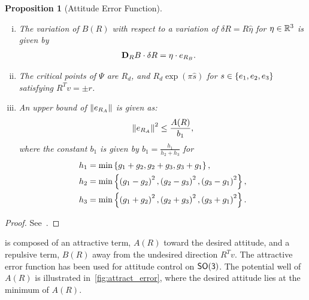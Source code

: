 \documentclass[letterpaper, 10 pt, conference]{ieeeconf}  %
\newtheorem{prop}{Proposition}
\begin{document}
\begin{prop}[Attitude Error Function]
\begin{enumerate}[(i)]
	\begin{align}
		\dirDiff{A}{R} &= \eta \cdot e_{R_A} .
	\end{align}
	\item \label{item:prop_erb} The variation of \( B(R) \) with respect to a variation of \( \delta R = R \hat{\eta} \) for \( \eta \in \mathbb{R}^3 \) is given by
	\begin{align}
		\mathbf{D}_{R} B \cdot \delta R &= \eta \cdot e_{R_{B}} .
	\end{align}
	\item \label{item:prop_crit}The critical points of \( \Psi \) are $R_d$, and $R_d \exp(\pi \hat{s})$ for $s \in \left\{ e_1, e_2, e_3 \right\}$ satisfying $R^T v = \pm r$.
	\item \label{item:prop_era_upbound}An upper bound of \( \left\| e_{R_A} \right\| \) is given as:
	\begin{align}
		\left\| e_{R_A} \right\|^2 \leq \frac{A(R)}{b_1} , \label{eqn:psi_lower_bound}
	\end{align}
	where the constant \( b_1 \) is given by \( b_1 = \frac{h_1}{h_2 + h_3} \) for 
	\begin{align*}
		h_1 &= \min\left\{ g_1 + g_2, g_2 + g_3 , g_3 + g_1 \right\} ,\\
		h_2 &= \min\left\{ \left( g_1 -g_2 \right)^2,\left( g_2 -g_3 \right)^2 , \left( g_3 -g_1 \right)^2 \right\} ,\\
		h_3 &= \min\left\{ \left( g_1 + g_2 \right)^2, \left( g_2 + g_3 \right)^2 , \left( g_3 + g_1 \right)^2 \right\}.		
	\end{align*}
\end{enumerate}
\end{prop}
\begin{proof}
See~.
\end{proof}

 is composed of an attractive term, \( A (R) \) toward the desired attitude, and a repulsive term, \( B(R) \) away from the undesired direction \( R^T v \).
The attractive error function has been used for attitude control on \(\mathsf{SO(3)}\).
The potential well of \( A(R)\) is illustrated in~\cref{fig:attract_error}, where the desired attitude lies at the minimum of \( A(R) \).
\end{document}
